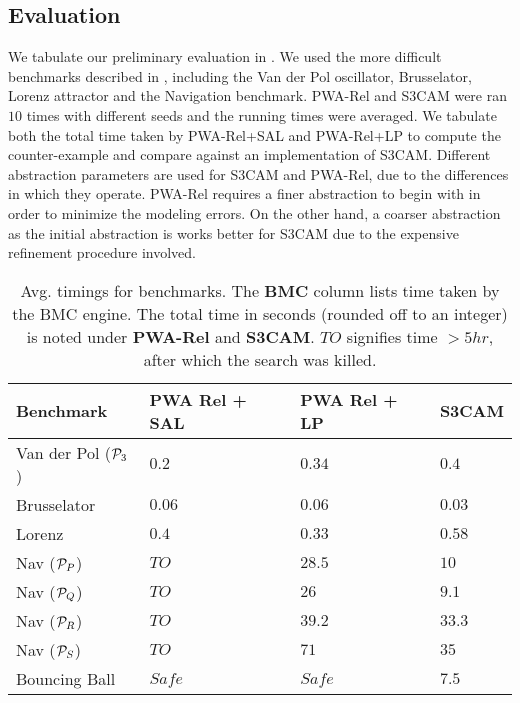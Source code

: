 \subsection{Evaluation}
We tabulate our preliminary evaluation in . We used
the more difficult benchmarks described in \cite{zutshi2014multiple},
including the Van der Pol oscillator, Brusselator, Lorenz attractor
and the Navigation benchmark. PWA-Rel and S3CAM were ran $10$ times
with different seeds and the running times were averaged. We tabulate
both the total time taken by PWA-Rel+SAL and PWA-Rel+LP to compute the
counter-example and compare against an implementation of S3CAM.
Different abstraction parameters are used for S3CAM and PWA-Rel, due
to the differences in which they operate. PWA-Rel requires a finer
abstraction to begin with in order to minimize the modeling errors.
On the other hand, a coarser abstraction as the initial abstraction is
works better for S3CAM due to the expensive refinement procedure
involved.

\begin{table}[!htbp]
\centering
\caption{Avg. timings for benchmarks. The \textbf{BMC} column lists
time taken by the BMC engine. The total time in seconds (rounded off
to an integer) is noted under \textbf{PWA-Rel} and \textbf{S3CAM}.
$TO$ signifies time $>5hr$, after which the search was killed.}
\label{tab:res-rel}
\begin{tabular}{@{}llll@{}}
\toprule
    Benchmark & PWA Rel + SAL & PWA Rel + LP & S3CAM\\
\midrule
    Van der Pol ($\mathcal{P}_3$)   &$0.2$ & $0.34$ & $0.4$\\
    Brusselator               &$0.06$ & $0.06$ & $0.03$\\
    Lorenz                    &$0.4$ & $0.33$ & $0.58$\\
    Nav ($\mathcal{P}_P$)           &$TO$ & $28.5$  & $10$ \\%
    Nav ($\mathcal{P}_Q$)           &$TO$ & $26$   & $9.1$ \\%
    Nav ($\mathcal{P}_R$)           &$TO$ & $39.2$  & $33.3$\\
    Nav ($\mathcal{P}_S$)           &$TO$ & $71$  & $35$\\
    Bouncing Ball             &$Safe$ & $Safe$  & $7.5$\\

\bottomrule
\end{tabular}
\end{table}

